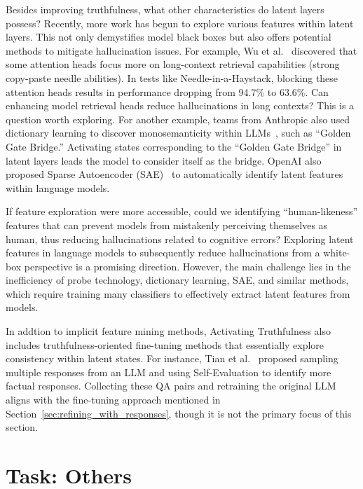 \documentclass[lettersize,journal]{IEEEtran}
\begin{document}
Besides improving truthfulness, what other characteristics do latent layers possess? Recently, more work has begun to explore various features within latent layers. This not only demystifies model black boxes but also offers potential methods to mitigate hallucination issues. For example, Wu et al.~\cite{RetrievalHead_24_arXiv_PKU} discovered that some attention heads focus more on long-context retrieval capabilities (strong copy-paste needle abilities). In tests like Needle-in-a-Haystack, blocking these attention heads results in performance dropping from 94.7\% to 63.6\%. Can enhancing model retrieval heads reduce hallucinations in long contexts? This is a question worth exploring. For another example, teams from Anthropic also used dictionary learning to discover monosemanticity within LLMs~\cite{templeton2024scaling}, such as ``Golden Gate Bridge.'' Activating states corresponding to the ``Golden Gate Bridge'' in latent layers leads the model to consider itself as the bridge. OpenAI also proposed Sparse Autoencoder (SAE)~\cite{gao2024scaling} to automatically identify latent features within language models.

If feature exploration were more accessible, could we identifying ``human-likeness'' features that can prevent models from mistakenly perceiving themselves as human, thus reducing hallucinations related to cognitive errors? Exploring latent features in language models to subsequently reduce hallucinations from a white-box perspective is a promising direction. However, the main challenge lies in the inefficiency of probe technology, dictionary learning, SAE, and similar methods, which require training many classifiers to effectively extract latent features from models.

In addtion to implicit feature mining methods, Activating Truthfulness also includes truthfulness-oriented fine-tuning methods that essentially explore consistency within latent states. For instance, Tian et al.~\cite{FactualFT_23_arXiv_Stanford} proposed sampling multiple responses from an LLM and using Self-Evaluation to identify more factual responses. Collecting these QA pairs and retraining the original LLM aligns with the fine-tuning approach mentioned in Section~\ref{sec:refining_with_responses}, though it is not the primary focus of this section.


\section{Task: Others} \label{sec:other_tasks}
\end{document}

